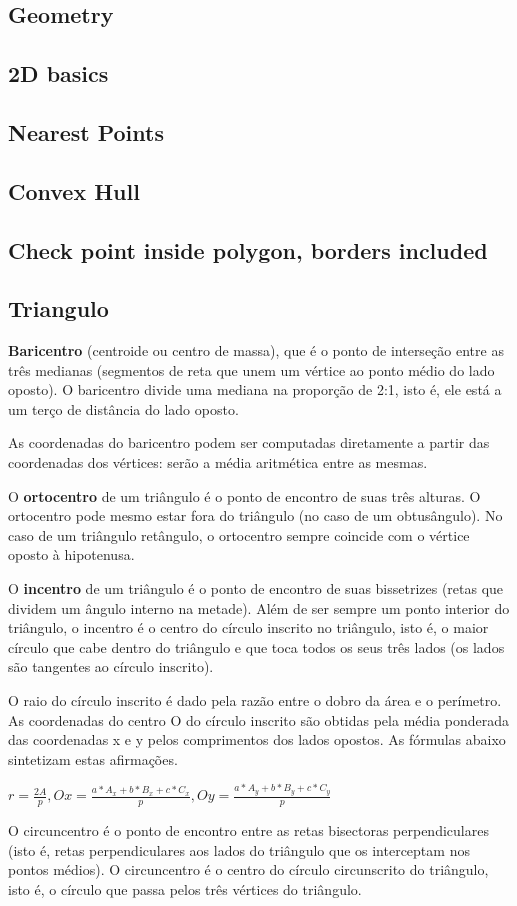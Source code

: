 \documentclass[a4paper,10pt,oneside]{article}
\newcommand\includes[2]{
   \subsection{#1}
   
}
\begin{document}
\begin{multicols}{2}
\section{Geometry}
\includes{2D basics}{code/geometry/2D.cpp}
\includes{Nearest Points}{code/geometry/near.cpp}
\includes{Convex Hull}{code/geometry/convexhull.cpp}
\includes{Check point inside polygon, borders included}{code/geometry/in_poly.cpp}

\subsection{Triangulo}
\textbf{Baricentro} (centroide ou centro de massa), que é o ponto de interseção entre as três medianas (segmentos de reta que unem um vértice ao ponto médio do lado oposto). O baricentro divide uma mediana na proporção de 2:1, isto é, ele está a um terço de distância do lado oposto.

As coordenadas do baricentro podem ser computadas diretamente a partir das coordenadas dos vértices: serão a média aritmética entre as mesmas.

O \textbf{ortocentro} de um triângulo é o ponto de encontro de suas três alturas. O ortocentro pode mesmo estar fora do triângulo (no caso de um obtusângulo). No caso de um triângulo retângulo, o ortocentro sempre coincide com o vértice oposto à hipotenusa.

O \textbf{incentro} de um triângulo é o ponto de encontro de suas bissetrizes (retas que dividem um ângulo interno na metade). Além de ser sempre um ponto interior do triângulo, o incentro é o centro do círculo inscrito no triângulo, isto é, o maior círculo que cabe dentro do triângulo e que toca todos os seus três lados (os lados são tangentes ao círculo inscrito).

O raio do círculo inscrito é dado pela razão entre o dobro da área e o perímetro. As coordenadas do centro O do círculo inscrito são obtidas pela média ponderada das coordenadas x e y pelos comprimentos dos lados opostos. As fórmulas abaixo sintetizam estas afirmações.

$r = \frac{2A}{p}, Ox = \frac{a*A_x + b*B_x + c*C_x}{p}, Oy = \frac{a*A_y + b*B_y + c*C_y}{p}$

O circuncentro é o ponto de encontro entre as retas bisectoras perpendiculares (isto é, retas perpendiculares aos lados do triângulo que os interceptam nos pontos médios). O circuncentro é o centro do círculo circunscrito do triângulo, isto é, o círculo que passa pelos três vértices do triângulo.


\end{multicols}
\end{document}
